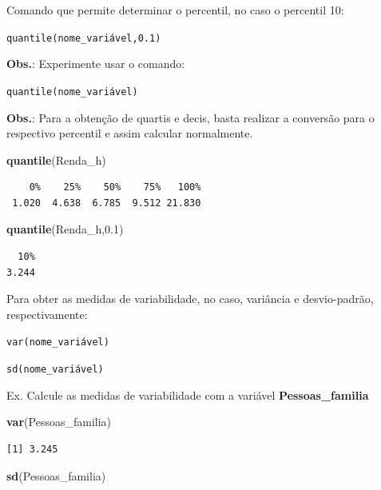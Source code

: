 \documentclass[12pt,portuguese,oneside]{book}
\newenvironment{Shaded}{\begin{snugshade}}{\end{snugshade}}
\newcommand{\KeywordTok}[1]{\textcolor[rgb]{0.13,0.29,0.53}{\textbf{#1}}}
\newcommand{\FloatTok}[1]{\textcolor[rgb]{0.00,0.00,0.81}{#1}}
\newcommand{\NormalTok}[1]{#1}
\begin{document}
Comando que permite determinar o percentil, no caso o percentil 10:

\texttt{quantile(nome\_variável,0.1)}

\textbf{Obs.}: Experimente usar o comando:

\texttt{quantile(nome\_variável)}

\textbf{Obs.}: Para a obtenção de quartis e decis, basta realizar a
conversão para o respectivo percentil e assim calcular normalmente.

\begin{Shaded}
\begin{Highlighting}[]
\KeywordTok{quantile}\NormalTok{(Renda_h)}
\end{Highlighting}
\end{Shaded}

\begin{verbatim}
    0%    25%    50%    75%   100% 
 1.020  4.638  6.785  9.512 21.830 
\end{verbatim}

\begin{Shaded}
\begin{Highlighting}[]
\KeywordTok{quantile}\NormalTok{(Renda_h,}\FloatTok{0.1}\NormalTok{)}
\end{Highlighting}
\end{Shaded}

\begin{verbatim}
  10% 
3.244 
\end{verbatim}

Para obter as medidas de variabilidade, no caso, variância e
desvio-padrão, respectivamente:

\texttt{var(nome\_variável)}

\texttt{sd(nome\_variável)}

Ex. Calcule as medidas de variabilidade com a variável
\textbf{Pessoas\_familia}

\begin{Shaded}
\begin{Highlighting}[]
\KeywordTok{var}\NormalTok{(Pessoas_familia)}
\end{Highlighting}
\end{Shaded}

\begin{verbatim}
[1] 3.245
\end{verbatim}

\begin{Shaded}
\begin{Highlighting}[]
\KeywordTok{sd}\NormalTok{(Pessoas_familia)}
\end{Highlighting}
\end{Shaded}
\end{document}

